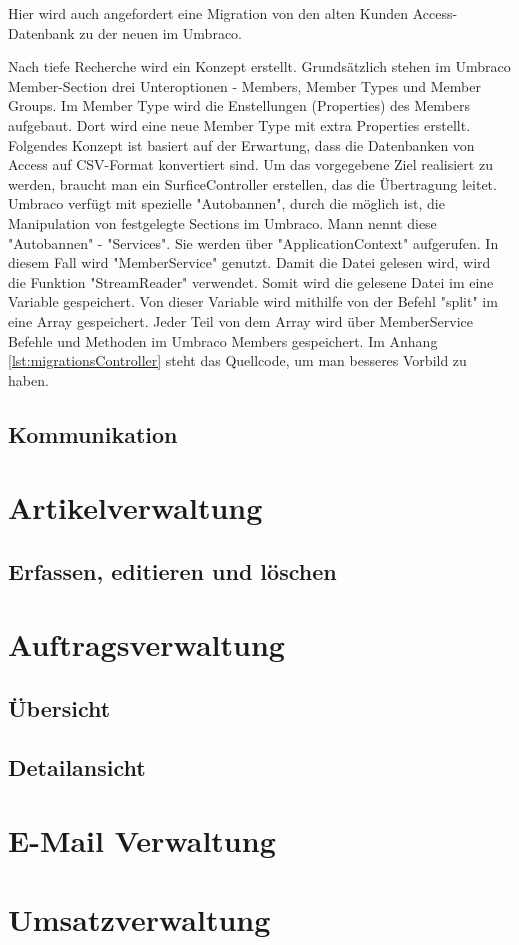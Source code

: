 Hier wird auch angefordert eine Migration von den alten Kunden Access-Datenbank zu der neuen im Umbraco.

Nach tiefe Recherche wird ein Konzept erstellt. 
Grundsätzlich stehen im Umbraco Member-Section \cite{OurUmbraco2018} drei Unteroptionen - Members, Member Types und Member Groups.
Im Member Type wird die Enstellungen (Properties) des Members aufgebaut. Dort wird eine neue Member Type mit extra Properties erstellt. 
Folgendes Konzept ist basiert auf der Erwartung, dass die Datenbanken von Access auf CSV-Format konvertiert sind.
Um das vorgegebene Ziel realisiert zu werden, braucht man ein SurficeController erstellen, das die Übertragung leitet. 
Umbraco verfügt mit spezielle "Autobannen", durch die möglich ist, die Manipulation von festgelegte Sections im Umbraco. Mann nennt diese "Autobannen" - "Services". Sie werden über "ApplicationContext" aufgerufen. In diesem Fall wird "MemberService" genutzt.
Damit die Datei gelesen wird, wird die Funktion "StreamReader" verwendet. Somit wird die gelesene Datei im eine Variable gespeichert. Von dieser Variable wird mithilfe von der Befehl "split" im eine Array gespeichert. Jeder Teil von dem Array wird über MemberService Befehle und Methoden im Umbraco Members gespeichert. Im Anhang \ref{lst:migrationsController} steht das Quellcode, um man besseres Vorbild zu haben.   

\subsection{Kommunikation}
\section{Artikelverwaltung}
\subsection{Erfassen, editieren und löschen}
\section{Auftragsverwaltung}
\subsection{Übersicht}
\subsection{Detailansicht}
\section{E-Mail Verwaltung}
\section{Umsatzverwaltung}


